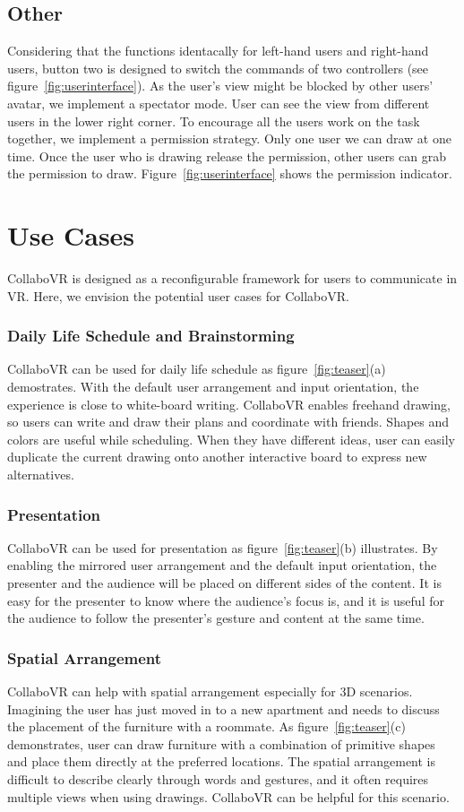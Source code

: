 \documentclass{sigchi}
\begin{document}
\subsection{Other}
Considering that the functions identacally for left-hand users and right-hand users, button two is designed to switch the commands of two controllers (see figure~\ref{fig:userinterface}). As the user's view might be blocked by other users' avatar, we implement a spectator mode. User can see the view from different users in the lower right corner. To encourage all the users work on the task together, we implement a permission strategy. Only one user we can draw at one time. Once the user who is drawing release the permission, other users can grab the permission to draw. Figure~\ref{fig:userinterface} shows the permission indicator.

\section{Use Cases}
CollaboVR is designed as a reconfigurable framework for users to communicate in VR. Here, we envision the potential user cases for CollaboVR.

\subsubsection{Daily Life Schedule and Brainstorming}
CollaboVR can be used for daily life schedule as figure~\ref{fig:teaser}(a) demostrates. With the default user arrangement and input orientation, the experience is close to white-board writing. CollaboVR enables freehand drawing, so users can write and draw their plans and coordinate with friends. Shapes and colors are useful while scheduling. When they have different ideas, user can easily duplicate the current drawing onto another interactive board to express new alternatives.

\subsubsection{Presentation}
CollaboVR can be used for presentation as figure~\ref{fig:teaser}(b) illustrates. By enabling the mirrored user arrangement and the default input orientation, the presenter and the audience will be placed on different sides of the content. It is easy for the presenter to know where the audience's focus is, and it is useful for the audience to follow the presenter's gesture and content at the same time.

\subsubsection{Spatial Arrangement}
CollaboVR can help with spatial arrangement especially for 3D scenarios. Imagining the user has just moved in to a new apartment and needs to discuss the placement of the furniture with a roommate. As figure~\ref{fig:teaser}(c) demonstrates, user can draw furniture with a combination of primitive shapes and place them directly at the preferred locations. The spatial arrangement is difficult to describe clearly through words and gestures, and it often requires multiple views when using drawings. CollaboVR can be helpful for this scenario.
\end{document}
